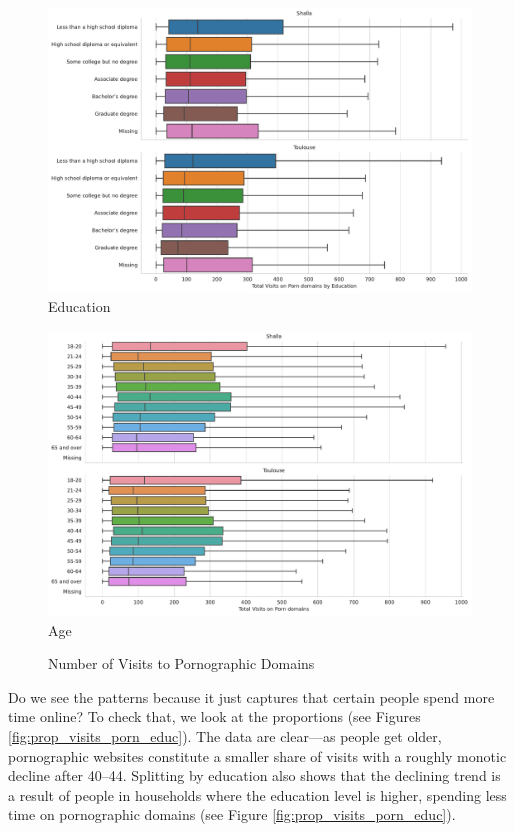 \documentclass[12pt, letterpaper]{article}
\begin{document}
\begin{figure}[!htb]
\centering
\caption{Number of Visits to Pornographic Domains}\label{fig:total_visits_porn}
	\begin{minipage}[b]{0.47\textwidth}
	\centering
	\label{fig:total_visits_porn_educ}
	\includegraphics[width=\textwidth]{figs/total_visits_porn_educ.pdf}\\Education
	\end{minipage}
	\begin{minipage}[b]{0.47\textwidth}
	\centering
	\label{fig:total_visits_porn_age}
	\includegraphics[width=\textwidth]{figs/total_visits_porn_age.pdf}\\Age
	\end{minipage}
\end{figure}

Do we see the patterns because it just captures that certain people spend more time online? To check that, we look at the proportions (see Figures \ref{fig:prop_visits_porn_educ}). The data are clear---as people get older, pornographic websites constitute a smaller share of visits with a roughly monotic decline after 40--44. Splitting by education also shows that the declining trend is a result of people in households where the education level is higher, spending less time on pornographic domains (see Figure \ref{fig:prop_visits_porn_educ}).
\end{document}
